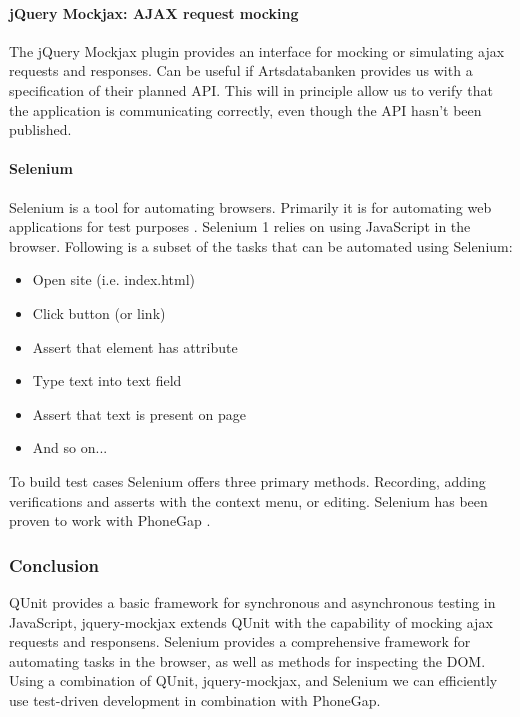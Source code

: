     \paragraph{jQuery Mockjax: AJAX request mocking}
	The jQuery Mockjax plugin provides an interface for mocking or simulating
	ajax requests and responses. \cite{github:jquery-mockjax} Can be useful if Artsdatabanken provides us
	with a specification of their planned API. This will in principle allow us
	to verify that the application is communicating correctly, even though the
	API hasn't been published.

    \paragraph{Selenium}
	Selenium is a tool for automating browsers. Primarily it is for automating
	web applications for test purposes \cite{seleniumhq:home}. Selenium 1 relies
	on using JavaScript in the browser. Following is a subset of the tasks that
	can be automated using Selenium:

	\begin{itemize}
		\item Open site (i.e. index.html)
		\item Click button (or link)
		\item Assert that element has attribute
		\item Type text into text field
		\item Assert that text is present on page
		\item And so on...
	\end{itemize}

	To build test cases Selenium offers three primary methods. Recording, adding
	verifications and asserts with the context menu, or editing. Selenium has
	been proven to work with PhoneGap \cite{phonegap:automatic-test-cases}.

\subsubsection{Conclusion}

	QUnit provides a basic framework for synchronous and asynchronous testing in
	JavaScript, jquery-mockjax extends QUnit with the capability of mocking ajax
	requests and responsens. Selenium provides a comprehensive framework for
	automating tasks in the browser, as well as methods for inspecting the DOM.
	Using a combination of QUnit, jquery-mockjax, and Selenium we can
	efficiently use test-driven development in combination with PhoneGap.
